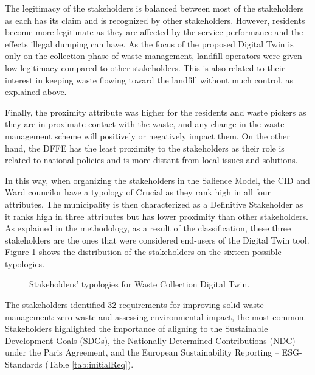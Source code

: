 \documentclass[authoryear,preprint,review,12pt]{elsarticle}
\begin{document}
    \begin{quotation}
    \end{quotation}

    The legitimacy of the stakeholders is balanced between most of the stakeholders as each has its claim and is recognized by other stakeholders. However, residents become more legitimate as they are affected by the service performance and the effects illegal dumping can have. As the focus of the proposed Digital Twin is only on the collection phase of waste management, landfill operators were given low legitimacy compared to other stakeholders. This is also related to their interest in keeping waste flowing toward the landfill without much control, as explained above.

    Finally, the proximity attribute was higher for the residents and waste pickers as they are in proximate contact with the waste, and any change in the waste management scheme will positively or negatively impact them. On the other hand, the DFFE has the least proximity to the stakeholders as their role is related to national policies and is more distant from local issues and solutions.

    In this way, when organizing the stakeholders in the Salience Model, the CID and Ward councilor have a typology of Crucial as they rank high in all four attributes. The municipality is then characterized as a Definitive Stakeholder as it ranks high in three attributes but has lower proximity than other stakeholders. As explained in the methodology, as a result of the classification, these three stakeholders are the ones that were considered end-users of the Digital Twin tool. Figure \ref{fig:typologies} shows the distribution of the stakeholders on the sixteen possible typologies.

    \begin{figure}
        \caption{Stakeholders’ typologies for Waste Collection Digital Twin.}
        \label{fig:typologies}
    \end{figure}

    The stakeholders identified 32 requirements for improving solid waste management: zero waste and assessing environmental impact, the most common. Stakeholders highlighted the importance of aligning to the Sustainable Development Goals (SDGs), the Nationally Determined Contributions (NDC) under the Paris Agreement, and the European Sustainability Reporting – ESG- Standards (Table \ref{tab:initialReq}).
\end{document}
